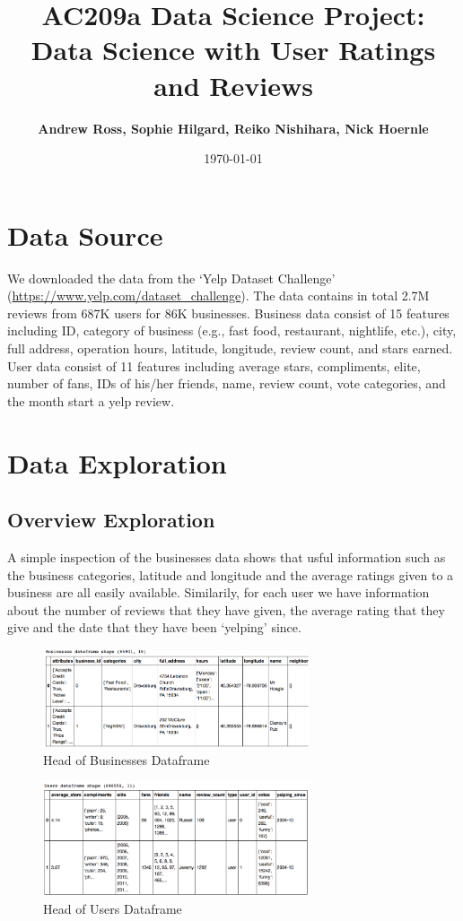 \documentclass[11pt]{article}
\title{
\vspace{1cm}
\textmd{\textbf{AC209a Data Science Project: Data Science with User Ratings and Reviews}}\\
}
\author{\textbf{Andrew Ross, Sophie Hilgard, Reiko Nishihara, Nick Hoernle}}
\date{\today} %
\begin{document}
\maketitle

\section*{Data Source}
We downloaded the data from the `Yelp Dataset Challenge' (\url{https://www.yelp.com/dataset_challenge}). The data contains in total 2.7M reviews from 687K users for 86K businesses. Business data consist of 15 features including ID, category of business (e.g., fast food, restaurant, nightlife, etc.), city, full address, operation hours, latitude, longitude, review count, and stars earned. User data consist of 11 features including average stars, compliments, elite, number of fans, IDs of his/her friends, name, review count, vote categories, and the month start a yelp review.

\section*{Data Exploration}

\subsection*{Overview Exploration}

\par A simple inspection of the businesses data shows that usful information such as the business categories, latitude and longitude and the average ratings given to a business are all easily available. Similarily, for each user we have information about the number of reviews that they have given, the average rating that they give and the date that they have been `yelping' since.

\begin{figure}[H]
\centering
\includegraphics[width=0.7\textwidth]{./ac209/bizdataframe.png}
\caption{Head of Businesses Dataframe}
\end{figure}

\begin{figure}[H]
\centering
\includegraphics[width=0.7\textwidth]{./ac209/userdataframe.png}
\caption{Head of Users Dataframe}
\end{figure}
\end{document}
